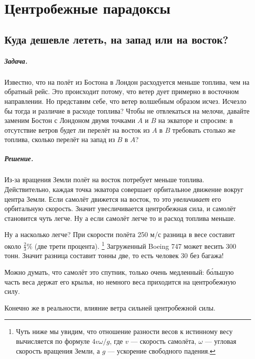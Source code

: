 \chapter{Центробежные парадоксы}

\section{Куда дешевле лететь, на запад или на восток?}

\paragraph{Задача.}
Известно, что на полёт из Бостона в Лондон расходуется меньше топлива, чем на обратный рейс.
Это происходит потому, что ветер дует примерно в восточном направлении.
Но представим себе, что ветер волшебным образом исчез.
Исчезло бы тогда и различие в расходе топлива?
Чтобы не отвлекаться на мелочи, давайте заменим Бостон с Лондоном двумя точками $A$ и $B$ на экваторе и спросим: в отсутствие ветров будет ли перелёт на восток из $A$ в $B$ требовать столько же топлива, сколько перелёт на запад из $B$ в $A$?

\paragraph{Решение.}
Из-за вращения Земли полёт на восток потребует меньше топлива.
Действительно, каждая точка экватора совершает орбитальное движение вокруг центра Земли.
Если самолёт движется на восток, то это \emph{увеличивает} его орбитальную скорость.
Значит увесличивается центробежная сила, и самолёт становится чуть легче.
Ну а если самолёт легче то и расход топлива меньше.

Ну а насколько легче?
При скорости полёта 250 м/с разница в весе составит около $
\tfrac23 \%$ (две трети процента).%
\footnote{Чуть ниже мы увидим, что отношение разности весов к истинному весу вычисляется по формуле
$4v\omega/g$,
где $v$ --- скорость самолёта,
$\omega$ --- угловая скорость вращения Земли,
а $g$ --- ускорение свободного падения.}
Загруженный Boeing 747 может весить 300 тонн.
Значит разница составит тонны две, то есть человек 30 без багажа!

Можно думать, что самолёт это спутник, только очень медленный:
б\'{о}льшую часть веса держат его крылья, но немного веса приходится на центробежную силу.

Конечно же в реальности, влияние ветра сильней центробежной силы.

